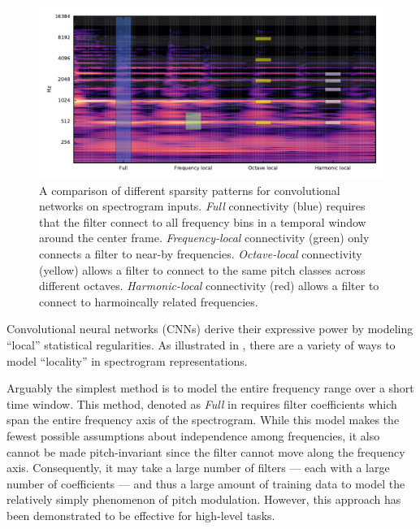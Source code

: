 \documentclass{article}
\begin{document}
\begin{figure}
    \includegraphics[width=\columnwidth]{figs/filter-shapes}
    \caption{A comparison of different sparsity patterns for convolutional networks on spectrogram inputs.
        \emph{Full} connectivity (blue) requires that the filter connect to all frequency bins in a temporal window around the center frame.
        \emph{Frequency-local} connectivity (green) only connects a filter to near-by frequencies.
        \emph{Octave-local} connectivity (yellow) allows a filter to connect to the same pitch classes across different octaves.
        \emph{Harmonic-local} connectivity (red) allows a filter to connect to harmoincally related frequencies.}
\label{figs:filter-shapes}
\end{figure}
Convolutional neural networks (CNNs) derive their expressive power by modeling ``local'' statistical regularities.
As illustrated in , there are a variety of ways to model ``locality'' in spectrogram representations.

Arguably the simplest method is to model the entire frequency range over a short time window.  
This method, denoted as \emph{Full} in  requires filter coefficients which span the entire frequency axis of the spectrogram.
While this model makes the fewest possible assumptions about independence among frequencies, it also cannot be made pitch-invariant since the filter cannot move along the frequency axis.
Consequently, it may take a large number of filters --- each with a large number of coefficients --- and thus a large amount of training data to model the relatively simply phenomenon of pitch modulation.
However, this approach has been demonstrated to be effective for high-level tasks. %
\end{document}
